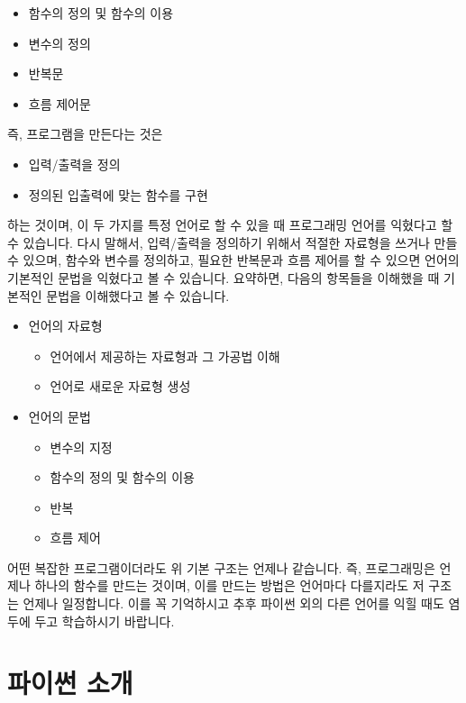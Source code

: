\documentclass[twoside]{article}
\begin{document}
\begin{itemize} 
\item 함수의 정의 및 함수의 이용 
\item 변수의 정의 
\item 반복문 
\item 흐름 제어문 
\end{itemize}

즉, 프로그램을 만든다는 것은 
\begin{itemize} 
\item 입력/출력을 정의 
\item 정의된 입출력에 맞는 함수를 구현
\end{itemize}

하는 것이며, 이 두 가지를 특정 언어로 할 수 있을 때 프로그래밍 언어를 익혔다고 할 수 있습니다. 다시 말해서, 입력/출력을 정의하기 위해서 적절한 자료형을 쓰거나 만들 수 있으며, 함수와 변수를 정의하고, 필요한 반복문과 흐름 제어를 할 수 있으면 언어의 기본적인 문법을 익혔다고 볼 수 있습니다. 요약하면, 다음의 항목들을 이해했을 때 기본적인 문법을 이해했다고 볼 수 있습니다. 


\begin{itemize} 
\item 언어의 자료형 
\begin{itemize}
\item 언어에서 제공하는 자료형과 그 가공법 이해 
\item 언어로 새로운 자료형 생성
\end{itemize} 
\item 언어의 문법 
\begin{itemize} 
\item 변수의 지정 
\item 함수의 정의 및 함수의 이용 
\item 반복 
\item 흐름 제어
\end{itemize}
\end{itemize}
 어떤 복잡한 프로그램이더라도 위 기본 구조는 언제나 같습니다. 즉, 프로그래밍은 언제나 하나의 함수를 만드는 것이며, 이를 만드는 방법은 언어마다 다를지라도 저 구조는 언제나 일정합니다. 이를 꼭 기억하시고 추후 파이썬 외의 다른 언어를 익힐 때도 염두에 두고 학습하시기 바랍니다. 


\section{파이썬 소개} 



\end{document}
